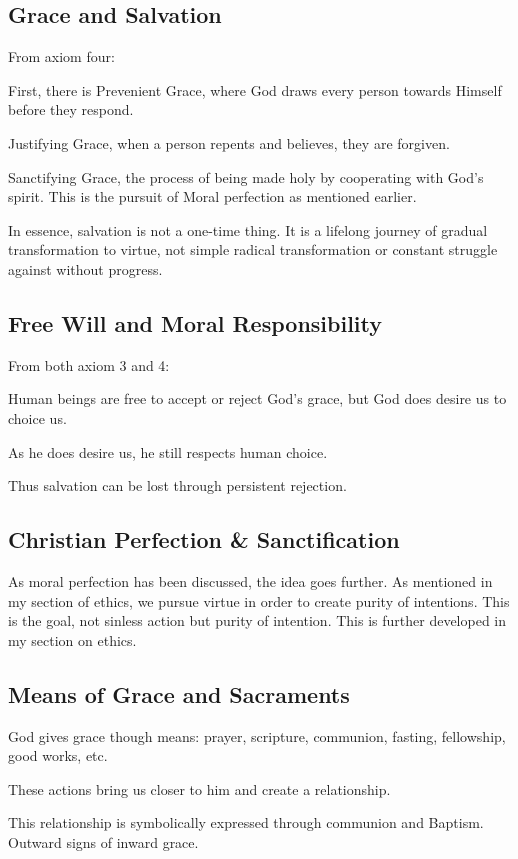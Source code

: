 \subsection{Grace and Salvation}
\par From axiom four: 
\par First, there is Prevenient Grace, where God draws every person towards Himself before they respond.
\par Justifying Grace, when a person repents and believes, they are forgiven.
\par Sanctifying Grace, the process of being made holy by cooperating with God's spirit. This is the pursuit of Moral perfection as mentioned earlier.
\par In essence, salvation is not a one-time thing. It is a lifelong journey of gradual transformation to virtue, not simple radical transformation or constant struggle against without progress. 
\subsection{Free Will and Moral Responsibility}
\par From both axiom 3 and 4:
\par Human beings are free to accept or reject God's grace, but God does desire us to choice us.
\par As he does desire us, he still respects human choice.
\par Thus salvation can be lost through persistent rejection.
\subsection{Christian Perfection \& Sanctification}
\par As moral perfection has been discussed, the idea goes further. As mentioned in my section of ethics, we pursue virtue in order to create purity of intentions. This is the goal, not sinless action but purity of intention. This is further developed in my section on ethics.
\subsection{Means of Grace and Sacraments}
\par God gives grace though means: prayer, scripture, communion, fasting, fellowship, good works, etc. 
\par These actions bring us closer to him and create a relationship.
\par This relationship is symbolically expressed through communion and Baptism. Outward signs of inward grace.
